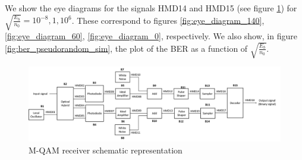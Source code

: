 We show the eye diagrams for the signals HMD14 and HMD15 (see figure \ref{fig:MQAM_receiver}) for $\sqrt{\frac{E_b}{n_0}}=10^{-8},1,10^6$. These correspond to figures \ref{fig:eye_diagram_140}, \ref{fig:eye_diagram_60}, \ref{fig:eye_diagram_0}, respectively. We also show, in figure \ref{fig:ber_pseudorandom_sim}, the plot of the BER as a function of $\sqrt{\frac{E_b}{n_0}}$.

\begin{figure}[]
	\centering
	\includegraphics[width=1.1\textwidth]{./lib/homodyne_receiver/figures/MQAM_receiver_block_diagram.png}
	\caption{M-QAM receiver schematic representation}
	\label{fig:MQAM_receiver}
\end{figure}


